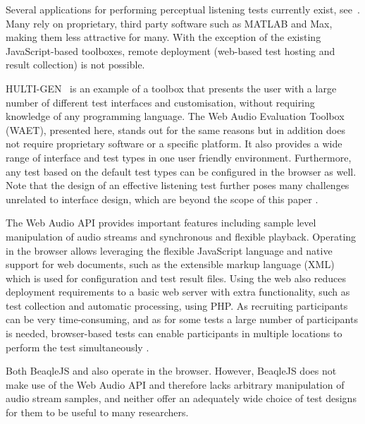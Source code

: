 \documentclass{sig-alternate}
\begin{document}

	Several applications for performing perceptual listening tests currently exist, see~. Many rely on proprietary, third party software such as MATLAB and Max, making them less attractive for many. With the exception of the existing JavaScript-based toolboxes, remote deployment (web-based test hosting and result collection) is not possible. 
	
	HULTI-GEN~\cite{hultigen} is an example of a toolbox that presents the user with a large number of different test interfaces and customisation, without requiring knowledge of any programming language. The Web Audio Evaluation Toolbox (WAET), presented here, stands out for the same reasons but in addition does not require proprietary software or a specific platform. It also provides a wide range of interface and test types in one user friendly environment. Furthermore, any test based on the default test types can be configured in the browser as well. Note that the design of an effective listening test further poses many challenges unrelated to interface design, which are beyond the scope of this paper \cite{bech}. 

	The Web Audio API provides important features including sample level manipulation of audio streams \cite{schoeffler2015mushra} and synchronous and flexible playback. Operating in the browser allows leveraging the flexible JavaScript language and native support for web documents, such as the extensible markup language (XML) which is used for configuration and test result files. Using the web also reduces deployment requirements to a basic web server with extra functionality, such as test collection and automatic processing, using PHP. As recruiting participants can be very time-consuming, and as for some tests a large number of participants is needed, browser-based tests can enable participants in multiple locations to perform the test simultaneously \cite{schoeffler2015mushra}.

	Both BeaqleJS \cite{beaqlejs} and  also operate in the browser. However, BeaqleJS does not make use of the Web Audio API and therefore lacks arbitrary manipulation of audio stream samples, and neither offer an adequately wide choice of test designs for them to be useful to many researchers. %
	
\end{document}
